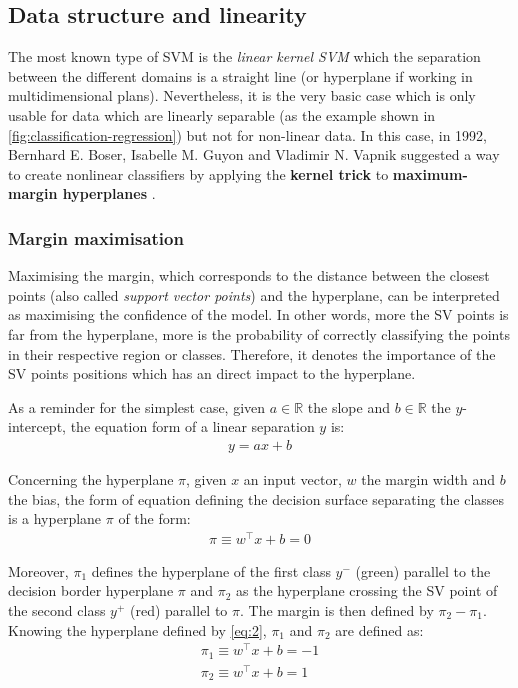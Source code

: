 \documentclass[11pt, openany]{report}
\theoremstyle{plain}
\theoremstyle{definition}
\theoremstyle{remark}
\begin{document}
\subsection{Data structure and linearity}
The most known type of SVM is the \textit{linear kernel SVM} which the separation between the different domains is a straight line (or hyperplane if working in multidimensional plans). Nevertheless, it is the very basic case which is only usable for data which are linearly separable (as the example shown in \autoref{fig:classification-regression}) but not for non-linear data. In this case, in 1992, Bernhard E. Boser, Isabelle M. Guyon and Vladimir N. Vapnik suggested a way to create nonlinear classifiers by applying the \textbf{kernel trick} to \textbf{maximum-margin hyperplanes} \cite{svm-margin}. 

\subsubsection{Margin maximisation}
Maximising the margin, which corresponds to the distance between the closest points (also called \textit{support vector points}) and the hyperplane, can be interpreted as maximising the confidence of the model. In other words, more the SV points is far from the hyperplane, more is the probability of correctly classifying the points in their respective region or classes. Therefore, it denotes the importance of the SV points positions which has an direct impact to the hyperplane. 

As a reminder for the simplest case, given $a \in \mathbb{R}$ the slope and $b \in \mathbb{R}$ the $y$-intercept, the equation form of a linear separation $y$ is:  
\begin{align} \label{eq:1}
y = ax + b
\end{align}

Concerning the hyperplane $\pi$, given $x$ an input vector, $w$ the margin width and $b$ the bias, the form of equation defining the decision surface separating the classes is a hyperplane $\pi$ of the form: 
\begin{align} \label{eq:2}
\pi \equiv w^\top x + b = 0
\end{align}

Moreover, $\pi_{1}$ defines the hyperplane of the first class $y^{-}$ (green) parallel to the decision border hyperplane $\pi$ and $\pi_{2}$ as the hyperplane crossing the SV point of the second class $y^{+}$ (red) parallel to $\pi$. The margin is then defined by $\pi_{2}-\pi_{1}$. Knowing the hyperplane defined by \autoref{eq:2}, $\pi_{1}$ and $\pi_{2}$ are defined as: 
\begin{align} \label{eq:3}
\pi_{1} \equiv w^\top x + b = -1 \\
\pi_{2} \equiv w^\top x + b = 1
\end{align}
\end{document}
